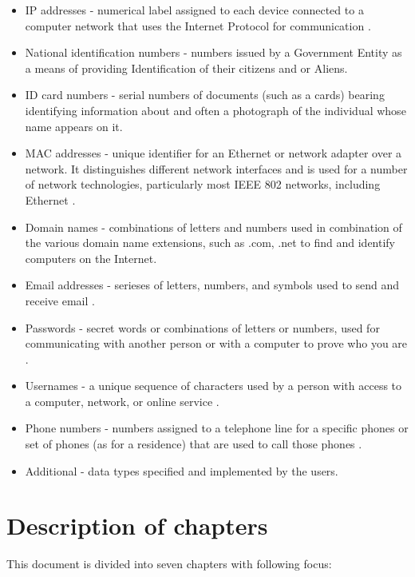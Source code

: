 \documentclass[a4paper,twoside,12pt]{book}
\begin{document}
\begin{itemize}
   \item IP addresses - numerical label assigned to each device connected to a computer network that uses the Internet Protocol for communication \cite{bib:articleIP}.
   \item National identification numbers - numbers issued by a Government Entity as a means of providing Identification of their citizens and or Aliens\cite{bib:internetIdentityNumber}.
   \item ID card numbers - serial numbers of documents (such as a cards) bearing identifying information about and often a photograph of the individual whose 
   name appears on it\cite{bib:internetID}. 
   \item MAC addresses - unique identifier for an Ethernet or network adapter over a network. It distinguishes different network interfaces and is used for a number 
   of network technologies, particularly most IEEE 802 networks, including Ethernet \cite{bib:internetMAC}.
   \item Domain names - combinations of letters and numbers used in combination of the various domain name extensions, such as .com, .net to find and 
   identify computers on the Internet\cite{bib:internetDomain}.
   \item Email addresses - serieses of letters, numbers, and symbols used to send and receive email \cite{bib:internetEmail}.
   \item Passwords - secret words or combinations of letters or numbers, used for communicating with another person or with a computer to prove who you are \cite{bib:internetPassword}.
   \item Usernames - a unique sequence of characters used by a person with access to a computer, network, or online service \cite{bib:internetUsername}.
   \item Phone numbers - numbers assigned to a telephone line for a specific phones or set of phones (as for a residence) that are used to call those phones \cite{bib:internetPhone}.
   \item Additional - data types specified and implemented by the users.
\end{itemize}


\section{Description of chapters}

This document is divided into seven chapters with following focus:
\end{document}
